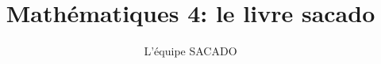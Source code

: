 





\title{Mathématiques 4\ieme : le livre sacado}
\author{L'équipe SACADO}






\maketitle

%
%
%
%
%
%
%
%
%
%
%
%
%
%
